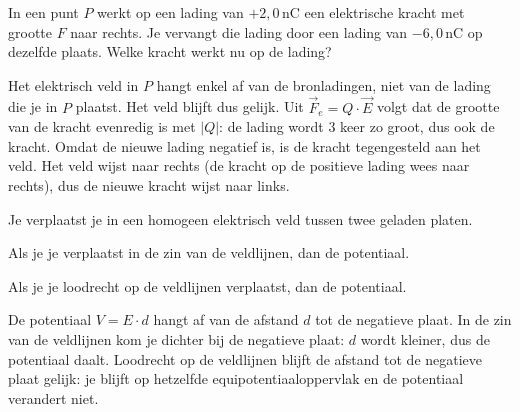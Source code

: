 \documentclass{ximera}
\begin{document}
\begin{question}
    In een punt $P$ werkt op een lading van $+2{,}0 \, \mathrm{nC}$ een elektrische kracht met grootte $F$ naar rechts. Je vervangt die lading door een lading van $-6{,}0 \, \mathrm{nC}$ op dezelfde plaats. Welke kracht werkt nu op de lading?

    \begin{multipleChoice}
    \end{multipleChoice}

    \begin{solution}\nl
        Het elektrisch veld in $P$ hangt enkel af van de bronladingen, niet van de lading die je in $P$ plaatst. Het veld blijft dus gelijk. Uit $\vec{F}_e = Q \cdot \vec{E}$ volgt dat de grootte van de kracht evenredig is met $|Q|$: de lading wordt $3$ keer zo groot, dus ook de kracht. Omdat de nieuwe lading negatief is, is de kracht tegengesteld aan het veld. Het veld wijst naar rechts (de kracht op de positieve lading wees naar rechts), dus de nieuwe kracht wijst naar links.
    \end{solution}
\end{question}

\begin{question}
    Je verplaatst je in een homogeen elektrisch veld tussen twee geladen platen.

    Als je je verplaatst in de zin van de veldlijnen, dan  de potentiaal.

    Als je je loodrecht op de veldlijnen verplaatst, dan  de potentiaal.

    \begin{solution}\nl
        De potentiaal $V = E \cdot d$ hangt af van de afstand $d$ tot de negatieve plaat. In de zin van de veldlijnen kom je dichter bij de negatieve plaat: $d$ wordt kleiner, dus de potentiaal daalt. Loodrecht op de veldlijnen blijft de afstand tot de negatieve plaat gelijk: je blijft op hetzelfde equipotentiaaloppervlak en de potentiaal verandert niet.
    \end{solution}
\end{question}
\end{document}

